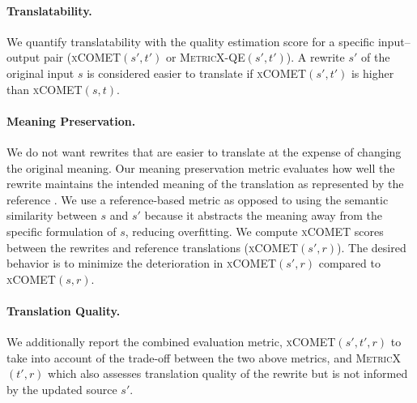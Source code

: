 \paragraph{Translatability.}
We quantify translatability with the quality estimation score for a specific input--output pair (\textsc{xCOMET}$(s', t')$ or \textsc{MetricX-QE}$(s',t')$). A rewrite $s'$ of the original input $s$ is considered easier to translate if \textsc{xCOMET}$(s', t')$ is higher than \textsc{xCOMET}$(s, t)$.

\paragraph{Meaning Preservation.} We do not want rewrites that are easier to translate at the expense of changing the original meaning. Our meaning preservation metric evaluates how well the rewrite maintains the intended meaning of the translation as represented by the reference \citep{Graham2015CanMT}. We use a reference-based metric as opposed to using the semantic similarity between $s$ and $s'$ because it abstracts the meaning away from the specific formulation of $s$, reducing overfitting. We compute \textsc{xCOMET} scores between the rewrites and reference translations (\textsc{xCOMET}$(s',r)$). The desired behavior is to minimize the deterioration in \textsc{xCOMET}$(s',r)$ compared to \textsc{xCOMET}$(s,r)$.


\paragraph{Translation Quality.} We additionally report the combined evaluation metric, \textsc{xCOMET}$(s',t',r)$ to take into account of the trade-off between the two above metrics, and \textsc{MetricX}$(t',r)$ which also assesses translation quality of the rewrite but is not informed by the updated source $s'$.

